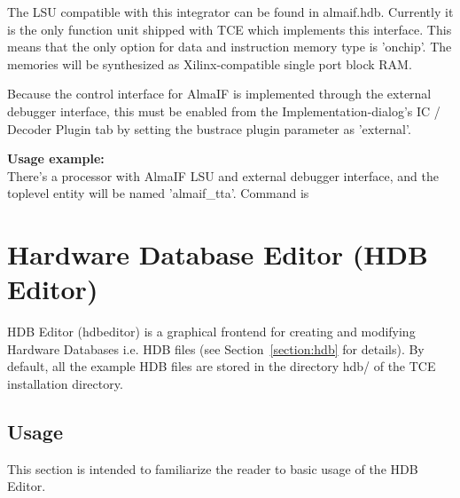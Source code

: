 \documentclass[twoside]{tceusermanual}
\begin{document}
The LSU compatible with this integrator can be found in almaif.hdb. Currently
it is the only function unit shipped with TCE which implements this interface.
This means that the only option for data and instruction memory type is
'onchip'. The memories will be synthesized as Xilinx-compatible single port
block RAM.

Because the control interface for AlmaIF is implemented through the external
debugger interface, this must be enabled from the Implementation-dialog's
IC / Decoder Plugin tab by setting the bustrace plugin parameter as 'external'.

\textbf{Usage example:} \\
There's a processor with AlmaIF LSU and external debugger interface, and the
toplevel entity will be named 'almaif\_tta'. Command is



\section{Hardware Database Editor (HDB Editor)}
\label{sec:hdbedit}
 

HDB Editor (hdbeditor) is a graphical frontend for creating and
modifying Hardware Databases i.e. HDB files (see Section~\ref{section:hdb}
for details). By default, all the example HDB files are stored in the directory
hdb/ of the TCE installation directory.

\subsection{Usage}

This section is intended to familiarize the reader to basic usage of the HDB
Editor.
\end{document}
